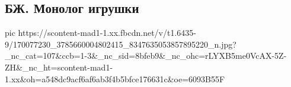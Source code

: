  
 
 
 
 

\subsection{БЖ. Монолог игрушки}
\label{sec:07_04_2021.fb.bilchenko_evgenia.1.monolog_igrushka}


\ifcmt
  pic https://scontent-mad1-1.xx.fbcdn.net/v/t1.6435-9/170077230_3785660004802415_8347635053857895220_n.jpg?_nc_cat=107&ccb=1-3&_nc_sid=8bfeb9&_nc_ohc=rLYXB5me0VcAX-5Z-ZH&_nc_ht=scontent-mad1-1.xx&oh=a548dc9acf6af6ab3f4b5bfce176631c&oe=6093B55F
\fi


